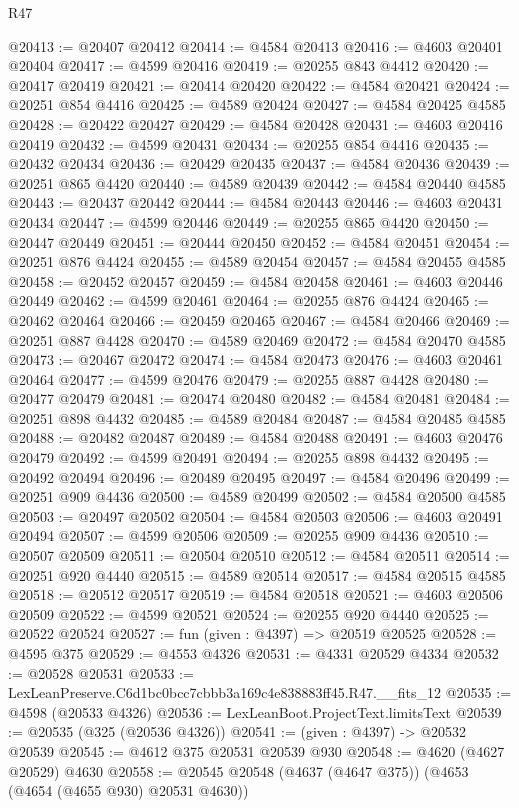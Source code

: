 \begin{lexlean}{R47}
\begin{coremodule}
@20413 := @20407 @20412
@20414 := @4584 @20413
@20416 := @4603 @20401 @20404
@20417 := @4599 @20416
@20419 := @20255 @843 @4412
@20420 := @20417 @20419
@20421 := @20414 @20420
@20422 := @4584 @20421
@20424 := @20251 @854 @4416
@20425 := @4589 @20424
@20427 := @4584 @20425 @4585
@20428 := @20422 @20427
@20429 := @4584 @20428
@20431 := @4603 @20416 @20419
@20432 := @4599 @20431
@20434 := @20255 @854 @4416
@20435 := @20432 @20434
@20436 := @20429 @20435
@20437 := @4584 @20436
@20439 := @20251 @865 @4420
@20440 := @4589 @20439
@20442 := @4584 @20440 @4585
@20443 := @20437 @20442
@20444 := @4584 @20443
@20446 := @4603 @20431 @20434
@20447 := @4599 @20446
@20449 := @20255 @865 @4420
@20450 := @20447 @20449
@20451 := @20444 @20450
@20452 := @4584 @20451
@20454 := @20251 @876 @4424
@20455 := @4589 @20454
@20457 := @4584 @20455 @4585
@20458 := @20452 @20457
@20459 := @4584 @20458
@20461 := @4603 @20446 @20449
@20462 := @4599 @20461
@20464 := @20255 @876 @4424
@20465 := @20462 @20464
@20466 := @20459 @20465
@20467 := @4584 @20466
@20469 := @20251 @887 @4428
@20470 := @4589 @20469
@20472 := @4584 @20470 @4585
@20473 := @20467 @20472
@20474 := @4584 @20473
@20476 := @4603 @20461 @20464
@20477 := @4599 @20476
@20479 := @20255 @887 @4428
@20480 := @20477 @20479
@20481 := @20474 @20480
@20482 := @4584 @20481
@20484 := @20251 @898 @4432
@20485 := @4589 @20484
@20487 := @4584 @20485 @4585
@20488 := @20482 @20487
@20489 := @4584 @20488
@20491 := @4603 @20476 @20479
@20492 := @4599 @20491
@20494 := @20255 @898 @4432
@20495 := @20492 @20494
@20496 := @20489 @20495
@20497 := @4584 @20496
@20499 := @20251 @909 @4436
@20500 := @4589 @20499
@20502 := @4584 @20500 @4585
@20503 := @20497 @20502
@20504 := @4584 @20503
@20506 := @4603 @20491 @20494
@20507 := @4599 @20506
@20509 := @20255 @909 @4436
@20510 := @20507 @20509
@20511 := @20504 @20510
@20512 := @4584 @20511
@20514 := @20251 @920 @4440
@20515 := @4589 @20514
@20517 := @4584 @20515 @4585
@20518 := @20512 @20517
@20519 := @4584 @20518
@20521 := @4603 @20506 @20509
@20522 := @4599 @20521
@20524 := @20255 @920 @4440
@20525 := @20522 @20524
@20527 := fun (given : @4397) => @20519 @20525
@20528 := @4595 @375
@20529 := @4553 @4326
@20531 := @4331 @20529 @4334
@20532 := @20528 @20531
@20533 := LexLeanPreserve.C6d1bc0bcc7cbbb3a169c4e838883ff45.R47.__fits_12
@20535 := @4598 (@20533 @4326)
@20536 := LexLeanBoot.ProjectText.limitsText
@20539 := @20535 (@325 (@20536 @4326))
@20541 := (given : @4397) -> @20532 @20539
@20545 := @4612 @375 @20531 @20539 @930
@20548 := @4620 (@4627 @20529) @4630
@20558 := @20545 @20548 (@4637 (@4647 @375)) (@4653 (@4654 (@4655 @930) @20531 @4630))

\end{coremodule}
\end{lexlean}
